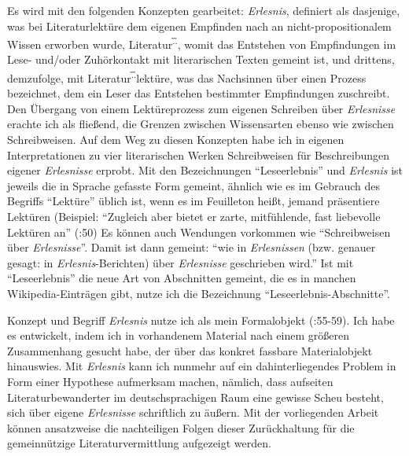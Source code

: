 \documentclass[fontsize=12pt]{scrartcl}
\begin{document}
Es wird mit den folgenden Konzepten gearbeitet: \textit{Erlesnis}, definiert als dasjenige, was bei Li\-te\-ra\-tur\-lekt\"ure dem eigenen Empfinden nach an nicht-pro\-po\-si\-ti\-o\-na\-lem Wissen erworben wurde, Li\-te\-ra\-tur\textsuperscript{\~.\~.}, womit das Entstehen von Emp\-fin\-dun\-gen im Lese- und/oder Zuh\"orkontakt mit li\-te\-ra\-rischen Texten gemeint ist, und drittens, demzufolge, mit Li\-te\-ra\-tur\textsuperscript{\~.\~.}lekt\"ure, was das Nachsinnen \"uber einen Prozess be\-zeichnet, dem ein Leser\textsuperscript{\tiny *} das Entstehen bestimmter Emp\-fin\-dun\-gen zuschreibt. Den \"Ubergang von einem Lek\-t\"u\-re\-pro\-zess zum eigenen Schrei\-ben \"uber \textit{Erlesnisse} erachte ich als flie{\ss}end, die Grenzen zwischen Wissensarten ebenso wie zwischen Schreibweisen. Auf dem Weg zu diesen Konzepten habe ich in eigenen Interpretationen zu \mbox{vier} li\-te\-ra\-rischen Werken Schreibweisen f\"ur Beschreibungen eigener \textit{Erlesnisse} erprobt. Mit den Be\-zeichnungen "`Leseerlebnis"' und \textit{Erlesnis} ist jeweils die in Sprache gefasste Form gemeint, \"ahnlich wie es im Gebrauch des Begriffs "`Lekt\"ure"' \"ublich ist, wenn es im Feuilleton hei{\ss}t, jemand pr\"asentiere Lekt\"uren (Beispiel: "`Zugleich aber bietet er zarte, mitf\"uhlende, fast liebevolle Lekt\"uren an"' (\cite{Martus2011}:50) Es k\"onnen auch Wendungen vorkommen wie "`Schreibweisen \"uber \textit{Erlesnisse}"'. Damit ist dann gemeint: "`wie in \textit{Erlesnissen} (bzw. genauer gesagt: in \textit{Erlesnis}-Berichten) \"uber \textit{Erlesnisse} geschrieben wird."' 
Ist mit "`Leseerlebnis"' die neue Art von Abschnitten gemeint, die es in manchen Wi\-ki\-pe\-dia-Eintr\"agen gibt, nutze ich die Be\-zeichnung "`Leseerlebnis-Abschnitte"'.

Konzept und Begriff \textit{Erlesnis} nutze ich als mein Formalobjekt (\cite{Meyenetal2011}:55-59). Ich habe es ent\-wickelt, indem ich in vorhandenem Material nach einem gr\"o{\ss}eren Zusammenhang gesucht habe, der \"uber das konkret fassbare Materialobjekt hinauswies. Mit \textit{Erlesnis} kann ich nunmehr auf ein dahinterliegendes Pro\-blem in Form einer Hypothese aufmerksam machen, n\"amlich, dass aufseiten Li\-te\-ra\-tur\-bewanderter im deutschspra\-chi\-gen Raum eine gewisse Scheu be\-steht, sich \"uber eigene \textit{Erlesnisse} schriftlich zu \"au{\ss}ern. Mit der vorliegenden Arbeit k\"onnen ansatzweise die nachteiligen Folgen dieser Zur\"uckhaltung f\"ur die gemeinn\"utzige Li\-te\-ra\-tur\-ver\-mitt\-lung aufgezeigt werden.
\end{document}
